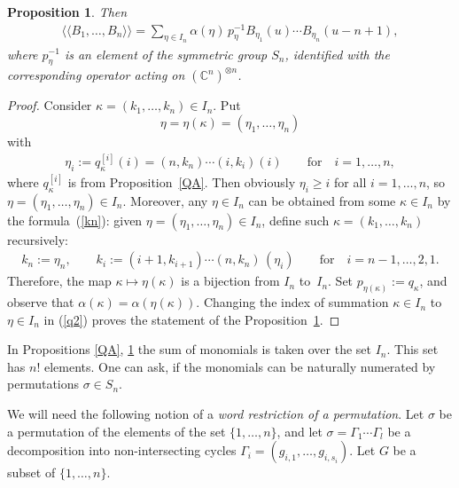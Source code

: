 \documentclass[11pt]{article}
\newtheorem{proposition}{Proposition}
\newcommand{\CC}{\mathbb C}    %
\begin{document}
\begin{proposition}\label{QB}
 Then
\begin{gather*}%
\langle \langle B_1,\dots, B_n\rangle \rangle
=\sum_{ \eta\in I_n }\alpha{( \eta)}\,p_\eta^{-1}B_{ \eta_1}(u)\cdots B_{ \eta_n}(u-n+1),
\end{gather*}
where $p_\eta^{-1}$   is an  element of the symmetric group $S_n$, identified with the corresponding operator acting on $(\CC^n)^{\otimes n}$.
 \end{proposition}

\begin{proof}
Consider $\kappa=(k_1, \dots, k_n)\in I_n$.  Put
\[
\eta=\eta(\kappa)=(\eta_1, \dots, \eta_n)
\] with
\begin{gather}\label{kn}
\eta_i:=q_{\kappa}^{[i]}(i)=(n,k_n)\cdots (i, k_i) (i)  \qquad\text{for}\quad  i=1,\dots, n,
\end{gather}
where $q_{\kappa}^{[i]}$ is from Proposition~\ref{QA}.
Then obviously $\eta_i\!\ge\! i$ for all $i=1, \dots, n$, so \mbox{$\eta\!=\!(\eta_1, \dots, \eta_n)\!\in\! I_n$}. Moreover, any $\eta\in I_n$ can be obtained from some $\kappa \in I_n$ by the formula~(\ref{kn}): given $\eta=(\eta_1, \dots, \eta_n)\in I_n$, def\/ine  such $\kappa=(k_1, \dots, k_n)$ recursively:
\begin{gather*}
k_n:= \eta_n,\qquad
k_i:= (i+1,k_{i+1})\cdots (n, k_n)\,(\eta_i)\qquad \text{for}\quad i=n-1,\dots, 2,1.
\end{gather*}
Therefore, the map $\kappa\mapsto \eta(\kappa)$ is a bijection from $I_n$ to~$I_n$. Set $p_{\eta(\kappa)}:=q_\kappa$, and  observe that $\alpha(\kappa)= \alpha (\eta(\kappa))$. Changing the index of summation $\kappa \in I_n$ to  $\eta \in I_n$ in  (\ref{q2}) proves the statement  of the Proposition~\ref{QB}.
\end{proof}

In Propositions \ref{QA},  \ref{QB} the sum of monomials  is taken over the set $I_n$. This set   has  $n!$ elements. One can ask, if the monomials can be  naturally numerated by permutations  $\sigma\in S_n$.

We will need the following notion of a {\it word restriction of a permutation}.
 Let $\sigma$  be a permutation of the elements of the set $\{1, \dots, n\}$, and let $\sigma=\Gamma_1\cdots \Gamma_l$ be a decomposition  into non-intersecting cycles $\Gamma_i=(g_{i,1},\dots, g_{i,s_i})$.  Let $G$ be a subset of $\{1, \dots, n\}$.
\end{document}

